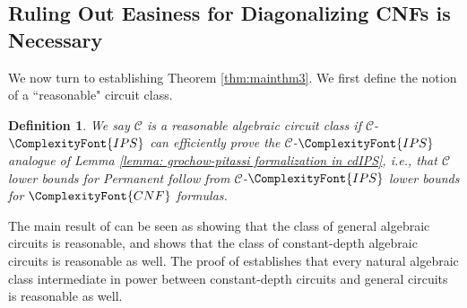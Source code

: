 \documentclass[11pt,letter]{article}
\newtheorem{definition}[theorem]{Definition}
\newtheorem{corollary}[theorem]{Corollary}
\theoremstyle{remark} %
\newcommand{\IPS}{%
    {
        \ComplexityFont{IPS} 
    }
}
\newcommand{\CNF}{ %
    {
        \ComplexityFont{CNF}
    }
}
\newcommand{\ACZ}{\ensuremath{\ComplexityFont{AC}^0}}
\newcommand{\ACZP}{\ensuremath{\ACZ[p]}}
\begin{document}
{%


\subsection{Ruling Out Easiness for Diagonalizing CNFs is Necessary}

    We now turn to establishing Theorem \ref{thm:mainthm3}. We first define the notion of a ``reasonable" circuit class. 

\begin{definition}
We say $\mathcal{C}$ is a \emph{reasonable}
algebraic circuit class if $\mathcal{C}$-$\IPS$ can efficiently prove the $\mathcal{C}$-$\IPS$ analogue of Lemma \ref{lemma: grochow-pitassi formalization in cdIPS}, i.e., that $\mathcal{C}$ lower bounds for Permanent follow from $\mathcal{C}$-$\IPS$ lower bounds for $\CNF$ formulas. 
\end{definition}

The main result of \cite{ST25} can be seen as showing that the class of general algebraic circuits is reasonable, and  shows that the class of constant-depth algebraic circuits is reasonable as well. The proof of   establishes that every natural algebraic class intermediate in power between constant-depth circuits and general circuits is reasonable as well.

}
\end{document}

